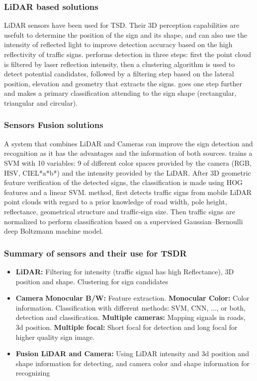 \subsubsection{LiDAR based solutions}
LiDAR sensors have been used for TSD. Their 3D perception capabilities are 
usefult to determine the position of the sign and its shape, and can also use 
the intensity of reflected light to improve detection accuracy based on the
high reflectivity of traffic signs. \cite{gargoum2017automated} 
performs detection in three steps: first the point cloud is filtered by 
laser reflection intensity, then a clustering algorithm is used to detect 
potential candidates, followed by a filtering step based on the lateral 
position, elevation and geometry that extracts the signs. 
\cite{weng2016road} goes one step further and makes a primary 
classification attending to the sign shape (rectangular, triangular and 
circular).

\subsubsection{Sensors Fusion solutions}
A system that combines LiDAR and Cameras can improve the sign detection and 
recognition as it has the advantages and the information of both sources. 
\cite{zhou2014lidar} trains a SVM with 10 variables: 9 of different color 
spaces provided by the camera (RGB, HSV, CIEL*a*b*) and the intensity provided 
by the LiDAR. After 3D geometric feature verification of the detected signs, 
the classification is made using HOG features and a linear SVM. 
\cite{guan2018robust} method, first detects traffic signs from mobile LiDAR 
point clouds with regard to a prior knowledge of road width, pole height, 
reflectance, geometrical structure and traffic-sign size. Then traffic signs 
are normalized to perform classification based on a supervised 
Gaussian–Bernoulli deep Boltzmann machine model.


\subsubsection{Summary of sensors and their use for TSDR}
\begin{itemize}%
\item \textbf{LiDAR:} Filtering for intensity (traffic signal has high Reflectance), 3D position and shape. Clustering for sign candidates
\item \textbf{Camera}
\subitem \textbf{Monocular B/W:} Feature extraction.
\subitem \textbf{Monocular Color:} Color information. Classification with 
different methods: SVM, CNN, ..., or both, detection and classification.
\subitem \textbf{Multiple cameras:} Mapping signals in roads, 3d position.
\subitem \textbf{Multiple focal:} Short focal for detection and long focal for 
higher quality sign image.
\item \textbf{Fusion LiDAR and Camera:} Using LiDAR intensity and 3d position 
and shape information for detecting, and camera color and shape information for 
recognizing
\end{itemize}

